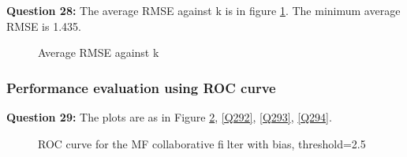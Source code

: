 \documentclass{article}
\begin{document}
\bigbreak \textbf{Question 28:}
The average RMSE against k is in figure \ref{Q28}. The minimum average RMSE is 1.435.

\begin{figure}
\centering
{}
\caption{Average RMSE against k} \label{Q28}
\end{figure}

\subsubsection{Performance evaluation using ROC curve}

\bigbreak \textbf{Question 29:}
The plots are as in Figure \ref{Q291}, \ref{Q292}, \ref{Q293}, \ref{Q294}.
\begin{figure}
\centering
{}
\caption{ROC curve for the MF collaborative filter with bias, threshold=2.5} \label{Q291}
\end{figure}
\end{document}
